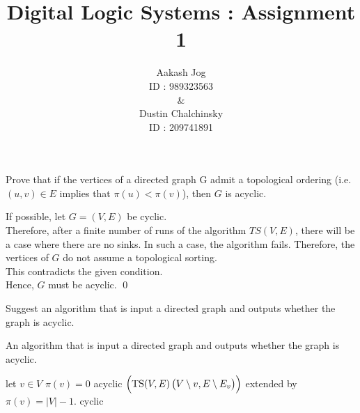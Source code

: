 \documentclass[fleqn, a4paper, 12pt, oneside]{amsart}
\title{Digital Logic Systems : Assignment 1}
\author{
	Aakash Jog\\
	ID : 989323563\\
	\&\\
	Dustin Chalchinsky\\
	ID : 209741891
	}
\date{\formatdate{17}{3}{2015}}
\theoremstyle{definition}
\theoremstyle{theorem}
\begin{document}
	
\maketitle

\begin{question}
	Prove that if the vertices of a directed graph G admit a topological ordering (i.e. $(u, v) \in E$ implies that  $\pi(u) < \pi(v)$), then $G$ is acyclic.
\end{question}

\begin{solution}
	If possible, let $G = (V, E)$ be cyclic.\\
	Therefore, after a finite number of runs of the algorithm $TS(V,E)$, there will be a case where there are no sinks.
	In such a case, the algorithm fails.
	Therefore, the vertices of $G$ do not assume a topological sorting.\\
	This contradicts the given condition.\\
	Hence, $G$ must be acyclic.
	\qed
\end{solution}

\begin{question}
	Suggest an algorithm that is input a directed graph and outputs whether the graph is acyclic.
\end{question}

\begin{algorithm}
	\caption{An algorithm that is input a directed graph and outputs whether the graph is acyclic.}
	\begin{algorithmic}
			\STATE let $v \in V$ \AND \RETURN $\pi(v) = 0$ 
			\AND 
			\RETURN acyclic
			\RETURN $\left( \textnormal{TS}(V,E) \left( V \setminus v, E \setminus E_v \right) \right)$ extended by $\pi(v) = |V| - 1$.
		\ELSE
			\RETURN cyclic
		\ENDIF
	\end{algorithmic}
\end{algorithm}
\end{document}
